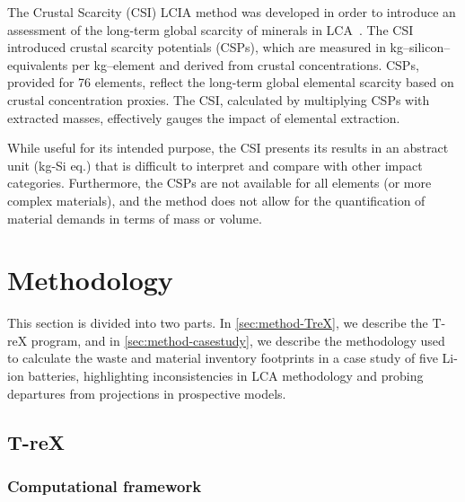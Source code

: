 \documentclass[a4paper,fleqn]{cas-dc}
\begin{document}
The Crustal Scarcity (CSI) LCIA method was developed in order to introduce an
assessment of the long-term global scarcity of minerals in
LCA~\citep{arvidsson2020csi}. The CSI introduced crustal scarcity potentials
(CSPs), which are measured in kg–silicon–equivalents per kg–element and
derived from crustal concentrations. CSPs, provided for 76 elements, reflect
the long-term global elemental scarcity based on crustal concentration proxies.
The CSI, calculated by multiplying CSPs with extracted masses, effectively
gauges the impact of elemental extraction.

While useful for its intended purpose, the CSI presents its results in an
abstract unit (kg-Si eq.) that is difficult to interpret and compare with other
impact categories. Furthermore, the CSPs are not available for all elements (or
more complex materials), and the method does not allow for the quantification
of material demands in terms of mass or volume.


\section{Methodology}\label{sec:methodology}

This section is divided into two parts. In \autoref{sec:method-TreX}, we
describe the T-reX program, and in \autoref{sec:method-casestudy}, we describe
the methodology used to calculate the waste and material inventory footprints
in a case study of five Li-ion batteries, highlighting inconsistencies in LCA
methodology and probing departures from projections in prospective models.

\subsection{T-reX}\label{sec:method-TreX}

\subsubsection{Computational framework}
\end{document}
